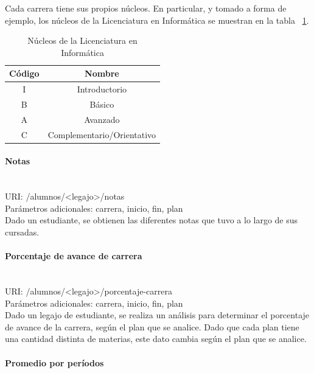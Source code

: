 Cada carrera tiene sus propios núcleos. En particular, y tomado a forma de ejemplo, los núcleos de la Licenciatura en Informática se muestran en la tabla ~\ref{tab:tabla_nucleos}.

\begin{table}[!htbp]
    \centering
    \makegapedcells
    \begin{tabular}{|c|c|}
    \hline
    Código & Nombre \\ \hline
    I & Introductorio \\ \hline
    B & Básico\\ \hline
    A & Avanzado \\ \hline
    C & Complementario/Orientativo \\ \hline
    \end{tabular}
    \caption{Núcleos de la Licenciatura en Informática}
    \label{tab:tabla_nucleos}
\end{table}


\paragraph{Notas}\mbox{}\\

URI: /alumnos/<legajo>/notas \\

Parámetros adicionales: carrera, inicio, fin, plan \\

Dado un estudiante, se obtienen las diferentes notas que tuvo a lo largo de sus cursadas.

\paragraph{Porcentaje de avance de carrera}\mbox{}\\

URI: /alumnos/<legajo>/porcentaje-carrera \\

Parámetros adicionales: carrera, inicio, fin, plan \\

Dado un legajo de estudiante, se realiza un análisis para determinar el porcentaje de avance de la carrera, según el plan que se analice. Dado que cada plan tiene una cantidad distinta de materias, este dato cambia según el plan que se analice.

\paragraph{Promedio por períodos}\mbox{}\\

